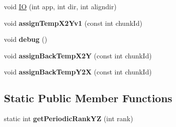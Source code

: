 \begin{DoxyCompactItemize}
\item 
void \mbox{\hyperlink{classPencilDcmp_aad302367ed6433ac0fab84c540b9ca49}{IO}} (int app, int dir, int aligndir)
\item 
\mbox{\label{classPencilDcmp_a022c8097572fb9ac205c2503e10edc31}} 
void {\bfseries assign\+Temp\+X2\+Yv1} (const int chunk\+Id)
\item 
\mbox{\label{classPencilDcmp_a7209e2cd68081b85de067e6d9a614d44}} 
void {\bfseries debug} ()
\item 
\mbox{\label{classPencilDcmp_a8b8f97d40f902f13234c635a6bba8bf8}} 
void {\bfseries assign\+Back\+Temp\+X2Y} (const int chunk\+Id)
\item 
\mbox{\label{classPencilDcmp_a2588c69ca3df97fb00c40bbd43e707b0}} 
void {\bfseries assign\+Back\+Temp\+Y2X} (const int chunk\+Id)
\end{DoxyCompactItemize}
\subsection*{Static Public Member Functions}
\begin{DoxyCompactItemize}
\item 
\mbox{\label{classPencilDcmp_afd40fa5e7cc43c9d3d4290279b5ed245}} 
static int {\bfseries get\+Periodic\+Rank\+YZ} (int rank)
\end{DoxyCompactItemize}
